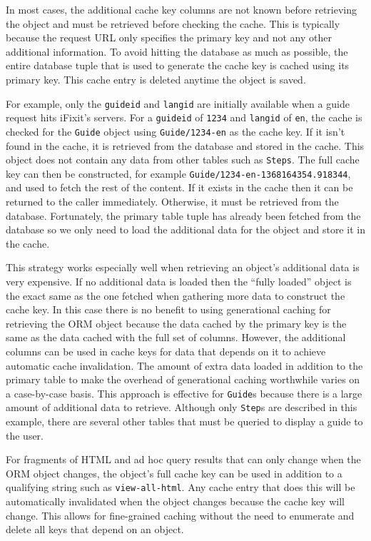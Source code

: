 \documentclass[12pt]{ucthesis}
\begin{document}
In most cases, the additional cache key columns are not known before retrieving the object and must be retrieved before checking the cache.
This is typically because the request URL only specifies the primary key and not any other additional information.
To avoid hitting the database as much as possible, the entire database tuple that is used to generate the cache key is cached using its primary key.
This cache entry is deleted anytime the object is saved.

For example, only the {\tt guideid} and {\tt langid} are initially available when a guide request hits \textsf{iFixit}'s servers.
For a {\tt guideid} of {\tt 1234} and {\tt langid} of {\tt en}, the cache is checked for the {\tt Guide} object using {\tt Guide/1234-en} as the cache key.
If it isn't found in the cache, it is retrieved from the database and stored in the cache.
This object does not contain any data from other tables such as {\tt Steps}.
The full cache key can then be constructed, for example {\tt Guide/1234-en-1368164354.918344}, and used to fetch the rest of the content.
If it exists in the cache then it can be returned to the caller immediately.
Otherwise, it must be retrieved from the database.
Fortunately, the primary table tuple has already been fetched from the database so we only need to load the additional data for the object and store it in the cache.

This strategy works especially well when retrieving an object's additional data is very expensive.
If no additional data is loaded then the ``fully loaded'' object is the exact same as the one fetched when gathering more data to construct the cache key.
In this case there is no benefit to using generational caching for retrieving the ORM object because the data cached by the primary key is the same as the data cached with the full set of columns.
However, the additional columns can be used in cache keys for data that depends on it to achieve automatic cache invalidation.
The amount of extra data loaded in addition to the primary table to make the overhead of generational caching worthwhile varies on a case-by-case basis.
This approach is effective for {\tt Guide}s because there is a large amount of additional data to retrieve.
Although only {\tt Step}s are described in this example, there are several other tables that must be queried to display a guide to the user.

For fragments of HTML and ad hoc query results that can only change when the ORM object changes, the object's full cache key can be used in addition to a qualifying string such as {\tt view-all-html}.
Any cache entry that does this will be automatically invalidated when the object changes because the cache key will change.
This allows for fine-grained caching without the need to enumerate and delete all keys that depend on an object.
\end{document}
